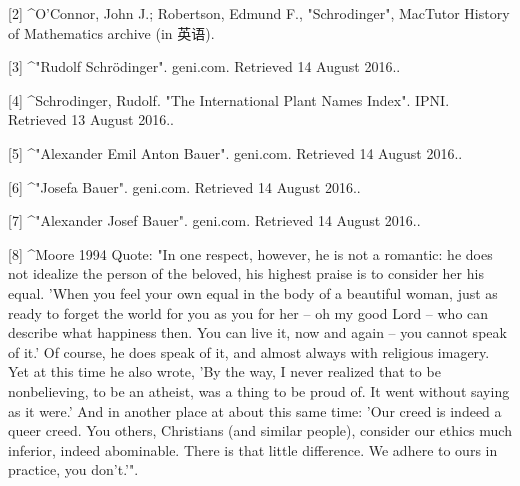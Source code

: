 [2]
^O'Connor, John J.; Robertson, Edmund F., "Schrodinger", MacTutor History of Mathematics archive (in 英语).

[3]
^"Rudolf Schrödinger". geni.com. Retrieved 14 August 2016..

[4]
^Schrodinger, Rudolf. "The International Plant Names Index". IPNI. Retrieved 13 August 2016..

[5]
^"Alexander Emil Anton Bauer". geni.com. Retrieved 14 August 2016..

[6]
^"Josefa Bauer". geni.com. Retrieved 14 August 2016..

[7]
^"Alexander Josef Bauer". geni.com. Retrieved 14 August 2016..

[8]
^Moore 1994 Quote: "In one respect, however, he is not a romantic: he does not idealize the person of the beloved, his highest praise is to consider her his equal. 'When you feel your own equal in the body of a beautiful woman, just as ready to forget the world for you as you for her – oh my good Lord – who can describe what happiness then. You can live it, now and again – you cannot speak of it.' Of course, he does speak of it, and almost always with religious imagery. Yet at this time he also wrote, 'By the way, I never realized that to be nonbelieving, to be an atheist, was a thing to be proud of. It went without saying as it were.' And in another place at about this same time: 'Our creed is indeed a queer creed. You others, Christians (and similar people), consider our ethics much inferior, indeed abominable. There is that little difference. We adhere to ours in practice, you don't.'".

